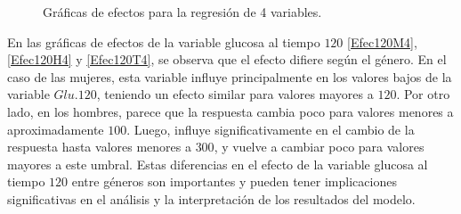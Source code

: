 \begin{figure}[H]
 \centering
    \caption{Gráficas de efectos para la regresión de 4 variables.}
    \label{fig:efecto4}
\end{figure}


En las gráficas de efectos de la variable glucosa al tiempo $120$ \ref{Efec120M4}, \ref{Efec120H4} y \ref{Efec120T4}, se observa que el efecto difiere según el género. En el caso de las mujeres, esta variable influye principalmente en los valores bajos de la variable $Glu.120$, teniendo un efecto similar para valores mayores a $120$. Por otro lado, en los hombres, parece que la respuesta cambia poco para valores menores a aproximadamente $100$. Luego, influye significativamente en el cambio de la respuesta hasta valores menores a $300$, y vuelve a cambiar poco para valores mayores a este umbral. Estas diferencias en el efecto de la variable glucosa al tiempo $120$ entre géneros son importantes y pueden tener implicaciones significativas en el análisis y la interpretación de los resultados del modelo.

